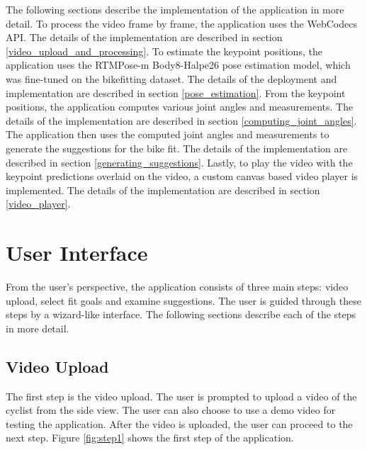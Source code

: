 The following sections describe the implementation of the application in more detail. To process the video frame by frame, the application uses the WebCodecs API. The details of the implementation are described in section \ref{video_upload_and_processing}. To estimate the keypoint positions, the application uses the RTMPose-m Body8-Halpe26 pose estimation model, which was fine-tuned on the bikefitting dataset. The details of the deployment and implementation are described in section \ref{pose_estimation}. From the keypoint positions, the application computes various joint angles and measurements. The details of the implementation are described in section \ref{computing_joint_angles}. The application then uses the computed joint angles and measurements to generate the suggestions for the bike fit. The details of the implementation are described in section \ref{generating_suggestions}. Lastly, to play the video with the keypoint predictions overlaid on the video, a custom canvas based video player is implemented. The details of the implementation are described in section \ref{video_player}.
\section{User Interface}
\label{application_structure}
From the user's perspective, the application consists of three main steps: video upload, select fit goals and examine suggestions. The user is guided through these steps by a wizard-like interface. The following sections describe each of the steps in more detail.


\subsection{Video Upload} The first step is the video upload. The user is prompted to upload a video of the cyclist from the side view. The user can also choose to use a demo video for testing the application. After the video is uploaded, the user can proceed to the next step. Figure \ref{fig:step1} shows the first step of the application.

